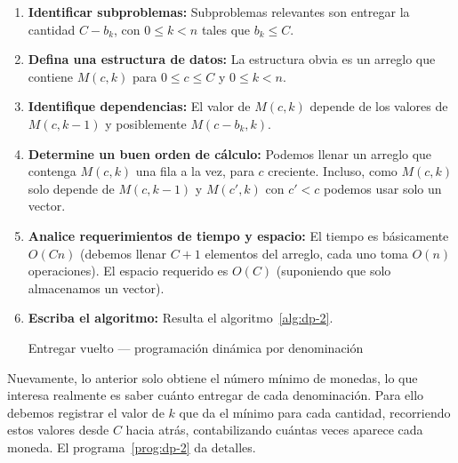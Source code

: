 \documentclass[english, spanish, fleqn]{article}
\begin{document}
\begin{enumerate}[label = {(\alph*)}]
\begin{algorithm}
      \caption{Entregar vuelto --- recursivo por valor y denominación}
      \label{alg:recursive-2}
    \end{algorithm}
  \item \textbf{Identificar subproblemas:}
    Subproblemas relevantes son entregar la cantidad \(C - b_k\),
    con \(0 \le k < n\) tales que \(b_k \le C\).
  \item \textbf{Defina una estructura de datos:}
    La estructura obvia es un arreglo que contiene \(M(c, k)\) para
    \(0 \le c \le C\) y \(0 \le k < n\).
  \item \textbf{Identifique dependencias:}
    El valor de \(M(c, k)\) depende de los valores
    de \(M(c, k - 1)\) y posiblemente \(M(c - b_k, k)\).
  \item \textbf{Determine un buen orden de cálculo:}
    Podemos llenar un arreglo que contenga \(M(c, k)\)
    una fila a la vez,
    para \(c\) creciente.
    Incluso,
    como \(M(c, k)\) solo depende de \(M(c, k - 1)\) y \(M(c', k)\)
    con \(c' < c \)
    podemos usar solo un vector.
  \item \textbf{Analice requerimientos de tiempo y espacio:}
    El tiempo es básicamente \(O(C n)\)
    (debemos llenar \(C + 1\) elementos del arreglo,
     cada uno toma \(O(n)\) operaciones).
    El espacio requerido es \(O(C)\)
    (suponiendo que solo almacenamos un vector).
  \item \textbf{Escriba el algoritmo:}
    Resulta el algoritmo~\ref{alg:dp-2}.
    \begin{algorithm}
      \DontPrintSemicolon\Indp


      \caption{Entregar vuelto --- programación dinámica por denominación}
      \label{alg:dp-2}
    \end{algorithm}
  \end{enumerate}
  Nuevamente,
  lo anterior solo obtiene el número mínimo de monedas,
  lo que interesa realmente es saber cuánto entregar de cada denominación.
  Para ello debemos
  registrar el valor de \(k\) que da el mínimo para cada cantidad,
  recorriendo estos valores desde \(C\) hacia atrás,
  contabilizando cuántas veces aparece cada moneda.
  El programa~\ref{prog:dp-2} da detalles.
  
\end{document}
